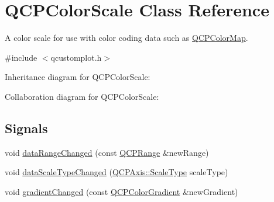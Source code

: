 \hypertarget{class_q_c_p_color_scale}{}\section{Q\+C\+P\+Color\+Scale Class Reference}
\label{class_q_c_p_color_scale}


A color scale for use with color coding data such as \hyperlink{class_q_c_p_color_map}{Q\+C\+P\+Color\+Map}.  




{\ttfamily \#include $<$qcustomplot.\+h$>$}



Inheritance diagram for Q\+C\+P\+Color\+Scale\+:


Collaboration diagram for Q\+C\+P\+Color\+Scale\+:
\subsection*{Signals}
\begin{DoxyCompactItemize}
\item 
void \hyperlink{class_q_c_p_color_scale_a685717490a6aa83c5e711a4f34e837f9}{data\+Range\+Changed} (const \hyperlink{class_q_c_p_range}{Q\+C\+P\+Range} \&new\+Range)
\item 
void \hyperlink{class_q_c_p_color_scale_a61558b962f7791ff2f15a565dcf60181}{data\+Scale\+Type\+Changed} (\hyperlink{class_q_c_p_axis_a36d8e8658dbaa179bf2aeb973db2d6f0}{Q\+C\+P\+Axis\+::\+Scale\+Type} scale\+Type)
\item 
void \hyperlink{class_q_c_p_color_scale_a5e5f8c5626242c8f7308bfab74d3d989}{gradient\+Changed} (const \hyperlink{class_q_c_p_color_gradient}{Q\+C\+P\+Color\+Gradient} \&new\+Gradient)
\end{DoxyCompactItemize}
